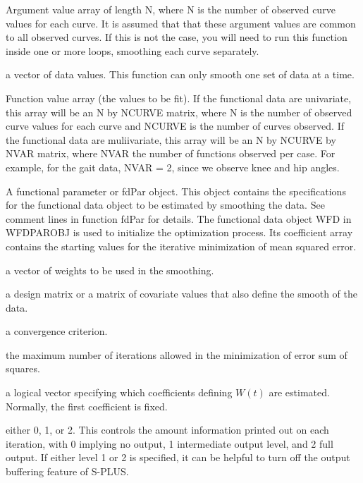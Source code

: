 \documentclass{article}
\begin{document}
\begin{Arguments}
\begin{ldescription}
\item[\code{argvals}] Argument value array of length N, where N is the number of observed
curve values for each curve.  It is assumed that that these argument
values are common to all observed curves.  If this is not the case,
you will need to run this function inside one or more loops,
smoothing each curve separately.

\item[\code{y}] a vector of data values.  This function can only smooth one set of
data at a time.

Function value array (the values to be fit).  If the functional data
are univariate, this array will be an N by NCURVE matrix, where N is
the number of observed curve values for each curve and NCURVE is the
number of curves observed.  If the functional data are muliivariate,
this array will be an N by NCURVE by NVAR matrix, where NVAR the
number of functions observed per case.  For example, for the gait
data, NVAR = 2, since we observe knee and hip angles.

\item[\code{WfdParobj}] A functional parameter or fdPar object.  This object contains the
specifications for the functional data object to be estimated by
smoothing the data.  See comment lines in function fdPar for
details.  The functional data object WFD in WFDPAROBJ is used to
initialize the optimization process.  Its coefficient array contains
the starting values for the iterative minimization of mean squared
error.

\item[\code{wtvec}] a vector of weights to be used in the smoothing.

\item[\code{zmat}] a design matrix or a matrix of covariate values that also define the
smooth of the data.

\item[\code{conv}] a convergence criterion.

\item[\code{iterlim}] the maximum number of iterations allowed in the minimization of
error sum of squares.

\item[\code{active}] a logical vector specifying which coefficients defining $W(t)$ are
estimated.  Normally, the first coefficient is fixed.

\item[\code{dbglev}] either 0, 1, or 2.  This controls the amount information printed out
on each iteration, with 0 implying no output, 1 intermediate output
level, and 2 full output.  If either level 1 or 2 is specified, it
can be helpful to turn off the output buffering feature of S-PLUS.

\end{ldescription}
\end{Arguments}
\end{document}
